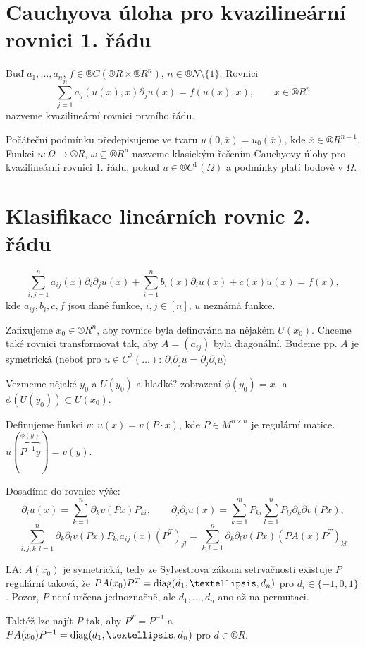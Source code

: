 \documentclass[12pt]{article}					%
\begin{document}
\section{Cauchyova úloha pro kvazilineární rovnici 1. řádu}
\begin{definice}
	Buď $a_1, …, a_n$, $f \in ®C(®R \times ®R^n)$, $n \in ®N \setminus \{1\}$. Rovnici
	$$ \sum_{j=1}^n a_j(u(x), x) \partial_j u(x) = f(u(x), x), \qquad x \in ®R^n $$
	nazveme kvazilineární rovnici prvního řádu.

	Počáteční podmínku předepisujeme ve tvaru $u(0, \overline{x}) = u_0(\overline{x})$, kde $\overline{x} \in ®R^{n-1}$. Funkci $u : \Omega \rightarrow ®R$, $\omega \subseteq ®R^n$ nazveme klasickým řešením Cauchyovy úlohy pro kvazilineární rovnici 1. řádu, pokud $u \in ®C^1(\Omega)$ a podmínky platí bodově v $\Omega$.
\end{definice}

\section{Klasifikace lineárních rovnic 2. řádu}
\begin{poznamka}
	$$ \sum_{i,j = 1}^n a_{ij}(x) \partial_i\partial_j u(x) + \sum_{i=1}^n b_i(x) \partial_i u(x) + c(x)u(x) = f(x), $$
	kde $a_{ij}, b_i, c, f$ jsou dané funkce, $i, j \in [n]$, $u$ neznámá funkce.

	Zafixujeme $x_0 \in ®R^n$, aby rovnice byla definována na nějakém $U(x_0)$. Chceme také rovnici transformovat tak, aby $A = (a_{ij})$ byla diagonální. Budeme pp. $A$ je symetrická (neboť pro $u \in C^2(…)$: $\partial_i\partial_j u = \partial_j\partial_i u$)
\end{poznamka}

\begin{definice}
	Vezmeme nějaké $y_0$ a $U(y_0)$ a hladké? zobrazení $\phi(y_0) = x_0$ a $\phi(U(y_0)) \subset U(x_0)$.

	Definujeme funkci $v$: $u(x) = v(P·x)$, kde $P \in M^{n \times n}$ je regulární matice. $u(\overbrace{P^{-1}y}^{\phi(y)}) = v(y)$.

	Dosadíme do rovnice výše:
	$$ \partial_i u(x) = \sum_{k=1}^n \partial_k v (P x) P_{ki}, \qquad \partial_j\partial_i u(x) = \sum_{k=1}^m P_{ki} \sum_{l=1}^n P_{lj} \partial_k\partial v(P x), $$
	$$ \sum_{i,j,k,l=1}^n \partial_k\partial_l v(P x) P_{ki} a_{ij}(x) (P^T)_{jl} = \sum_{k, l = 1}^n \partial_k\partial_l v(P x) (PA(x)P^T)_{kl} $$

	LA: $A(x_0)$ je symetrická, tedy ze Sylvestrova zákona setrvačnosti existuje $P$ regulární taková, že $P A(x_0) P^T = \diag(d_1, …, d_n)$ pro $d_i \in \{-1, 0, 1\}$. Pozor, $P$ není určena jednoznačně, ale $d_1, …, d_n$ ano až na permutaci.

	Taktéž lze najít $P$ tak, aby $P^T = P^{-1}$ a $PA(x_0)P^{-1} = \diag(d_1, …, d_n)$ pro $d \in ®R$.
\end{definice}
\end{document}
